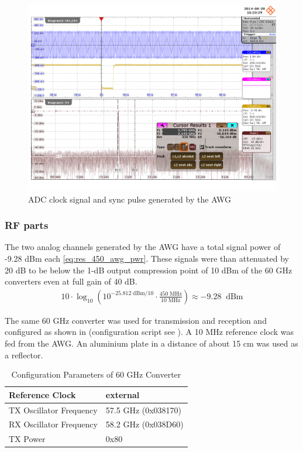 \begin{figure}[p]
  \centering
  \includegraphics[width=\textwidth]{figures/osci/res_450_awg_digital}
  \caption{\gls{ADC} clock signal and sync pulse generated by the \gls{AWG}}
  \label{fig:res_450_awg_digital}
\end{figure}

\subsubsection{RF parts}
The two analog channels generated by the \gls{AWG} have a total signal
power of -9.28 dBm each \eqref{eq:res_450_awg_pwr}. These signals were
than attenuated by 20 dB to be below the 1-dB output compression point of 10 dBm
of the 60 GHz converters even at full gain of 40 dB. \\

\begin{align}
  10 \cdot \log_{10}\left(
  10^{-25.812 \;\text{dBm} / 10} \cdot
  \frac{450 \;\text{MHz}}{10 \;\text{MHz}}
  \right) \approx -9.28 \;\;\text{dBm}
  \label{eq:res_450_awg_pwr}
\end{align}

The same 60 GHz converter was used for transmission and reception and
configured as shown in  (configuration script
see ).
A 10 MHz reference clock was fed from the \gls{AWG}.
An aluminium plate in a distance of about 15 cm was used as a reflector. \\

\begin{table}[h]
  \centering
  \begin{tabular}{|l|l|}
    \hline
    Reference Clock & external \\ \hline
    TX Oscillator Frequency & 57.5 GHz (0x038170) \\ \hline
    RX Oscillator Frequency & 58.2 GHz (0x038D60) \\ \hline
    TX Power & 0x80 \\ \hline
  \end{tabular}
  \caption{Configuration Parameters of 60 GHz Converter}
  \label{tab:res_450}
\end{table}


